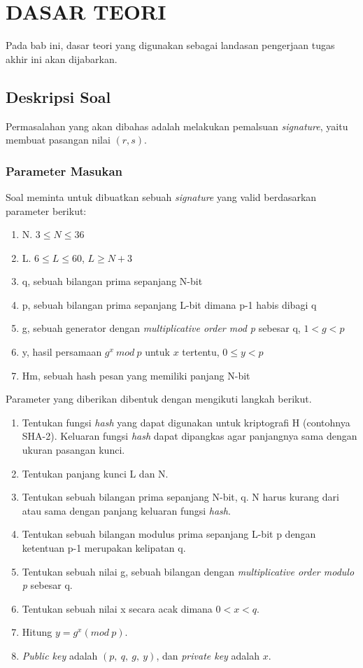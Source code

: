 \chapter {DASAR TEORI}

Pada bab ini, dasar teori yang digunakan sebagai landasan pengerjaan tugas akhir ini akan dijabarkan.

\section{Deskripsi Soal}

Permasalahan yang akan dibahas adalah melakukan pemalsuan \textit{signature}, yaitu membuat pasangan nilai $ (r, s) $.

\subsection{Parameter Masukan}

Soal meminta untuk dibuatkan sebuah \textit{signature} yang valid berdasarkan parameter berikut:
\begin{enumerate}
\item N. $3 \leq N \leq 36$
\item L. $6 \leq L \leq 60$, $L \geq N + 3$
\item q, sebuah bilangan prima sepanjang N-bit
\item p, sebuah bilangan prima sepanjang L-bit dimana p-1 habis dibagi q
\item g, sebuah generator dengan \textit{multiplicative order mod p} sebesar q, $1 < g < p$
\item y, hasil persamaan $g^x\ mod\ p$ untuk $x$ tertentu, $0 \leq y < p$
\item Hm, sebuah hash pesan yang memiliki panjang N-bit
\end{enumerate}

Parameter yang diberikan dibentuk dengan mengikuti langkah berikut.
\begin{enumerate}
\item Tentukan fungsi \textit{hash} yang dapat digunakan untuk kriptografi H (contohnya SHA-2). Keluaran fungsi \textit{hash} dapat dipangkas agar panjangnya sama dengan ukuran pasangan kunci.
\item Tentukan panjang kunci L dan N.
\item Tentukan sebuah bilangan prima sepanjang N-bit, q. N harus kurang dari atau sama dengan panjang keluaran fungsi \textit{hash}.
\item Tentukan sebuah bilangan modulus prima sepanjang L-bit p dengan ketentuan p-1 merupakan kelipatan q.
\item Tentukan sebuah nilai g, sebuah bilangan dengan \textit{multiplicative order modulo p} sebesar q.
\item Tentukan sebuah nilai x secara acak dimana $0 < x < q$.
\item Hitung $y = g^x (mod\ p)$.
\item \textit{Public key} adalah $\left(p,\ q,\ g,\ y\right)$, dan \textit{private key} adalah $x$.
\end{enumerate}


